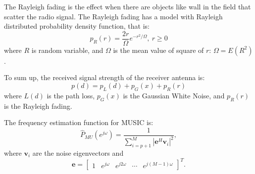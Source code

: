 The Rayleigh fading is the effect when there are objects like wall in the field that scatter the radio signal. The Rayleigh fading has a model with Rayleigh distributed probability density function, that is:
\begin{equation}
p_{R}(r)={\frac {2r}{\Omega }}e^{-r^{2}/\Omega },\ r\geq {}0
\end{equation}
where $R$ is random variable, and $\Omega$ is the mean value of square of $r$: $\Omega = E(R^{2})$.
\vspace{1cm}

To sum up, the received signal strength of the receiver antenna is:
\begin{equation}
p(d)=p_{L}(d)+p_{G}(x)+p_{R}(r)
\end{equation}
where $L(d)$ is the path loss, $p_{G}(x)$ is the Gaussian White Noise, and $p_{R}(r)$ is the Rayleigh fading.
\vspace{1cm}


The frequency estimation function for MUSIC is:
\begin{equation}
\hat P_{MU}(e^{j \omega}) = \frac{1}{\sum_{i=p+1}^{M} |\mathbf{e}^{H} \mathbf{v}_i|^2},
\end{equation}
where $\mathbf{v}_i$ are the noise eigenvectors and
\begin{equation}
\mathbf{e} = \begin{bmatrix}1 & e^{j \omega} & e^{j 2 \omega} & \cdots & e^{j (M-1) \omega}\end{bmatrix}^T.
\end{equation}

